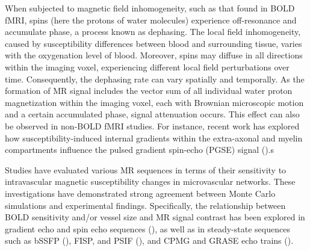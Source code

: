 When subjected to magnetic field inhomogeneity, such as that found in BOLD fMRI, spins (here the protons of water molecules) experience off-resonance and accumulate phase, a process known as dephasing. The local field inhomogeneity, caused by susceptibility differences between blood and surrounding tissue, varies with the oxygenation level of blood. Moreover, spins may diffuse in all directions within the imaging voxel, experiencing different local field perturbations over time. Consequently, the dephasing rate can vary spatially and temporally. As the formation of MR signal includes the vector sum of all individual water proton magnetization within the imaging voxel, each with Brownian microscopic motion and a certain accumulated phase, signal attenuation occurs. This effect can also be observed in non-BOLD fMRI studies. For instance, recent work has explored how susceptibility-induced internal gradients within the extra-axonal and myelin compartments influence the pulsed gradient spin-echo (PGSE) signal (\cite{winther2024susceptibility}).s

Studies have evaluated various MR sequences in terms of their sensitivity to intravascular magnetic susceptibility changes in microvascular networks. These investigations have demonstrated strong agreement between Monte Carlo simulations and experimental findings. Specifically, the relationship between BOLD sensitivity and/or vessel size and MR signal contrast has been explored in gradient echo and spin echo sequences (\cite{baez2017impact, boxerman1995mr}), as well as in steady-state sequences such as bSSFP (\cite{baez2017impact, bieri2007effect}), FISP, and PSIF (\cite{scheffler2019bold, khajehim2017investigating}), and CPMG and GRASE echo trains (\cite{scheffler2021bold}).

